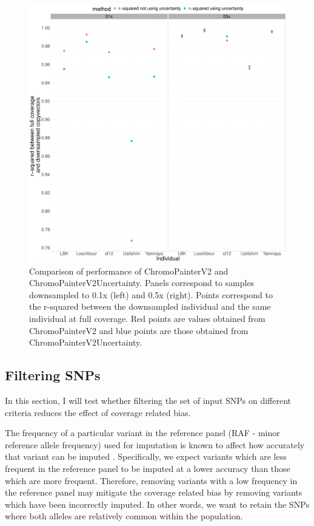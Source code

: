 {\begin{figure}[htp]
    \centering
    \includegraphics[width=1.0\textwidth]{../images/chapter1/uncertainty_v_noUncertainty_0.5x_0.1x.pdf}
    \caption{Comparison of performance of ChromoPainterV2 and ChromoPainterV2Uncertainty. Panels correspond to samples downsampled to 0.1x (left) and 0.5x (right). Points correspond to the r-squared between the downsampled individual and the same individual at full coverage. Red points are values obtained from ChromoPainterV2 and blue points are those obtained from ChromoPainterV2Uncertainty.}
    \label{fig:uncertainty_v_noUncertainty_0.5x_0.1x}
\end{figure}


\subsection{Filtering SNPs}

In this section, I will test whether filtering the set of input SNPs on different criteria reduces the effect of coverage related bias. 

The frequency of a particular variant in the reference panel (RAF - minor reference allele frequency) used for imputation is known to affect how accurately that variant can be imputed \cite{rubinacci2021efficient, delaneau2018integrative, Browning2016, hui2020evaluating}. Specifically, we expect variants which are less frequent in the reference panel to be imputed at a lower accuracy than those which are more frequent. Therefore, removing variants with a low frequency in the reference panel may mitigate the coverage related bias by removing variants which have been incorrectly imputed. In other words, we want to retain the SNPs where both alleles are relatively common within the population. 

}
